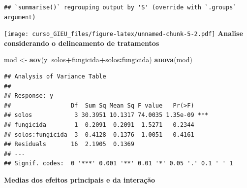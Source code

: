\documentclass[
]{book}
\newenvironment{Shaded}{\begin{snugshade}}{\end{snugshade}}
\newcommand{\DataTypeTok}[1]{\textcolor[rgb]{0.13,0.29,0.53}{#1}}
\newcommand{\KeywordTok}[1]{\textcolor[rgb]{0.13,0.29,0.53}{\textbf{#1}}}
\newcommand{\NormalTok}[1]{#1}
\newcommand{\OperatorTok}[1]{\textcolor[rgb]{0.81,0.36,0.00}{\textbf{#1}}}
\newcommand{\StringTok}[1]{\textcolor[rgb]{0.31,0.60,0.02}{#1}}
\begin{document}
\begin{Shaded}
\end{Shaded}

\begin{verbatim}
## `summarise()` regrouping output by 'S' (override with `.groups` argument)
\end{verbatim}

\texttt{[image: curso\_GIEU\_files/figure-latex/unnamed-chunk-5-2.pdf]}
\textbf{Analise considerando o delineamento de tratamentos}

\begin{Shaded}
\begin{Highlighting}[]
\NormalTok{mod <-}\StringTok{ }\KeywordTok{aov}\NormalTok{(y}\OperatorTok{~}\NormalTok{solos}\OperatorTok{+}\NormalTok{fungicida}\OperatorTok{+}\NormalTok{solos}\OperatorTok{:}\NormalTok{fungicida)}
\KeywordTok{anova}\NormalTok{(mod)}
\end{Highlighting}
\end{Shaded}

\begin{verbatim}
## Analysis of Variance Table
## 
## Response: y
##                 Df  Sum Sq Mean Sq F value   Pr(>F)    
## solos            3 30.3951 10.1317 74.0035 1.35e-09 ***
## fungicida        1  0.2091  0.2091  1.5271   0.2344    
## solos:fungicida  3  0.4128  0.1376  1.0051   0.4161    
## Residuals       16  2.1905  0.1369                     
## ---
## Signif. codes:  0 '***' 0.001 '**' 0.01 '*' 0.05 '.' 0.1 ' ' 1
\end{verbatim}

\textbf{Medias dos efeitos principais e da interação}
\end{document}
